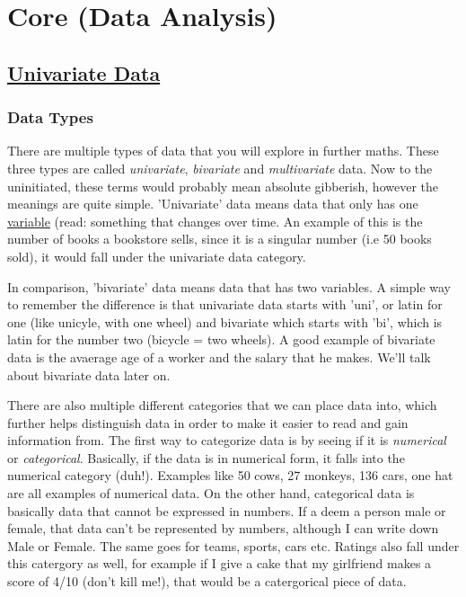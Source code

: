 \documentclass[11pt]{article}
\begin{document}
\newpage

\section*{Core (Data Analysis)}
\subsection*{\underline{Univariate Data}}
\subsubsection*{Data Types}
There are multiple types of data that you will explore in further maths. These three types are called \emph{univariate}, \emph{bivariate} and \emph{multivariate} data. Now to the uninitiated, these terms would probably mean absolute gibberish, however the meanings are quite simple. 'Univariate' data means data that only has one \underline{variable} (read: something that changes over time. An example of this is the number of books a bookstore sells, since it is a singular number (i.e 50 books sold), it would fall under the univariate data category. 

In comparison, 'bivariate' data means data that has two variables. A simple way to remember the difference is that univariate data starts with 'uni', or latin for one (like unicyle, with one wheel) and bivariate which starts with 'bi', which is latin for the number two (bicycle = two wheels). A good example of bivariate data is the avaerage age of a worker and the salary that he makes. We'll talk about bivariate data later on.

There are also multiple different categories that we can place data into, which further helps distinguish data in order to make it easier to read and gain information from. The first way to categorize data is by seeing if it is \emph{numerical} or \emph{categorical}. Basically, if the data is in numerical form, it falls into the numerical category (duh!). Examples like 50 cows, 27 monkeys, 136 cars, one hat are all examples of numerical data. On the other hand, categorical data is basically data that cannot be expressed in numbers. If a deem a person male or female, that data can't be represented by numbers, although I can write down Male or Female. The same goes for teams, sports, cars etc. Ratings also fall under this catergory as well, for example if I give a cake that my girlfriend makes a score of 4/10 (don't kill me!), that would be a catergorical piece of data.
\end{document}
